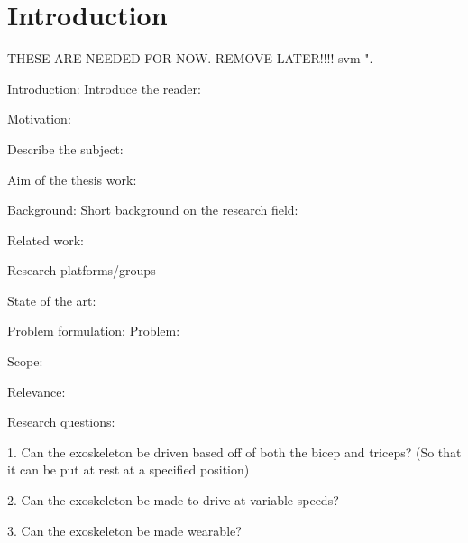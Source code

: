 \section{Introduction}
\label{section:intro}

THESE ARE NEEDED FOR NOW. REMOVE LATER!!!! \cite{IEEEtran, IEEEtranformatexample, webpage, FundConDep, exampleofjournalarticle, exampleofconferencepaper}
\ac{svm} \cite{exampleofconferencepaper}".

Introduction:
    Introduce the reader:

    Motivation:

    Describe the subject:

    Aim of the thesis work:


Background: 
    Short background on the research field:

    Related work:

    Research platforms/groups

    State of the art:


Problem formulation:
    Problem:

    Scope:
    
    Relevance:


Research questions:

1.	Can the exoskeleton be driven based off of both the bicep and triceps? (So that it can be put at rest at a specified position)

2.	Can the exoskeleton be made to drive at variable speeds?

3.	Can the exoskeleton be made wearable?

